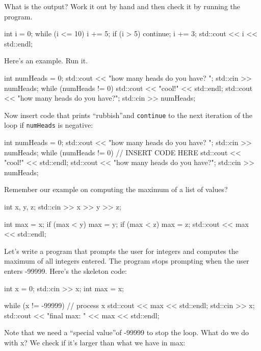 \begin{ex}
What is the output? Work it out by hand and then check it by running the program.
\begin{console}
int i = 0;
while (i <= 10)
{     
      i += 5;
      if (i > 5) continue;
      i += 3;
}
std::cout << i << std::endl;
\end{console}
\end{ex}
\begin{ex}
Here's an example. Run it.
\begin{console}
int numHeads = 0;
std::cout << "how many heads do you have? ";
std::cin >> numHeads;
while (numHeads != 0)
{     
      std::cout << "cool!" << std::endl;
      std::cout << "how many heads do you have?";
      std::cin >> numHeads;
}
\end{console}

Now insert code that prints ``rubbish''and \texttt{continue} to the next
iteration of the loop if \texttt{numHeads} is negative:
\begin{console}
int numHeads = 0;
std::cout << "how many heads do you have? ";
std::cin >> numHeads;
while (numHeads != 0)
{     
      // INSERT CODE HERE
      std::cout << "cool!" << std::endl;
      std::cout << "how many heads do you have?";
      std::cin >> numHeads;
}
\end{console}
\end{ex}
\newpage{}

Remember our example on computing the maximum of a list of values?
\begin{console}
int x, y, z;
std::cin >> x >> y >> z;

int max = x;
if (max < y) max = y;
if (max < z) max = z;
std::cout << max << std::endl;
\end{console}

Let's write a program that prompts the user for integers
and computes the maximum of all integers entered. The program stops
prompting when the user enters -99999. Here's the
skeleton code:
\begin{console}[commandchars=\~\@\$]
int x = 0;
std::cin >> x;
int max = x;

while (x != -99999)
{     
      // process x
      std::cout << max << std::endl;
      std::cin >> x;
}
std::cout << "final max: " << max
          << std::endl;
\end{console}

Note that we need a ``special value''of -99999 to stop the loop. What
do we do with x? We check if it's larger than what we
have in max:

